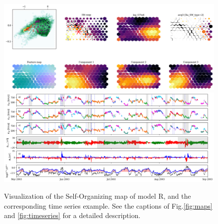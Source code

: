 \documentclass[utf8]{frontiersSCNS} %
\begin{document}
\begin{figure}[h!]
	\begin{center}
		\includegraphics[width=16cm]{Roberts/maps}\\%
			\includegraphics[width=18cm]{Roberts/timeseries}
	\end{center}
	\caption{Visualization of the Self-Organizing map of model R, and the corresponding time series example. See the captions of Fig.\ref{fig:maps}  and \ref{fig:timeseries} for a detailed description.}\label{fig:modelR}
\end{figure}
\end{document}
